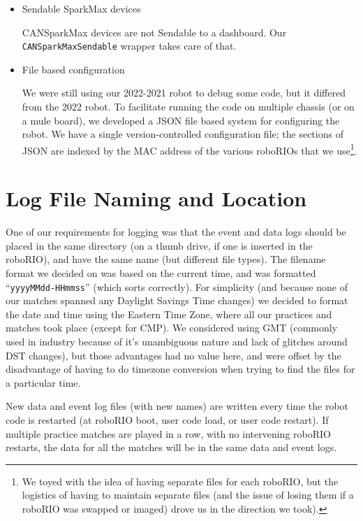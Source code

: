 \documentclass[]{article}
\newcommand{\zztt}[1]{{\texttt{\footnotesize{#1}}}}
\begin{document}
\begin{itemize}[topsep=0pt]
\item Sendable SparkMax devices

CANSparkMax devices are not Sendable to a dashboard. Our \zztt{CANSparkMaxSendable} wrapper takes care of that.

\item File based configuration

We were still using our 2022-2021 robot to debug some code, but it differed from the 2022 robot. To facilitate running the code on multiple chassis (or on a mule board), we developed a JSON file based system for configuring the robot. We have a single version-controlled configuration file; the sections of JSON are indexed by the MAC address of the various roboRIOs that we use\footnote{We toyed with the idea of having separate files for each roboRIO, but the logistics of having to maintain separate files (and the issue of losing them if a roboRIO was swapped or imaged) drove us in the direction we took).}.

\end{itemize}

\section {Log File Naming and Location}

One of our requirements for logging was that the event and data logs should be placed in the same directory (on a thumb drive, if one is inserted in the roboRIO), and have the same name (but different file types).
The filename format we decided on was based on the current time, and was formatted \mbox{``\zztt{yyyyMMdd-HHmmss}''} (which sorts correctly).
For simplicity (and because none of our matches spanned any Daylight Savings Time changes) we decided to format the date and time using the Eastern Time Zone, where all our practices and matches took place (except for CMP). We considered using GMT (commonly used in industry because of it's unambiguous nature and lack of glitches around DST changes), but those advantages had no value here, and were offset by the disadvantage of having to do timezone conversion when trying to find the files for a particular time.

New data and event log files (with new names) are written every time the robot code is restarted (at roboRIO boot, user code load, or user code restart). If multiple practice matches are played in a row, with no intervening roboRIO restarts, the data for all the matches will be in the same data and event logs.
\end{document}
